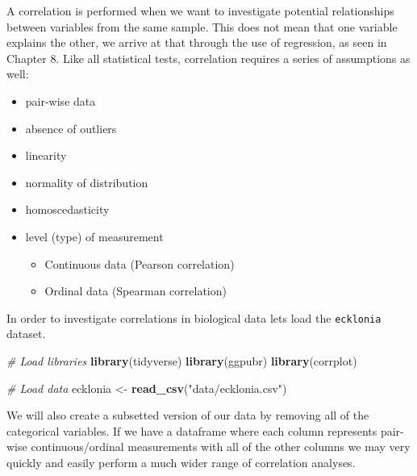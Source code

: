 \documentclass[english,10pt,a4paper,oneside]{book}
\providecommand{\tightlist}{%
  \setlength{\itemsep}{0pt}\setlength{\parskip}{0pt}}
\newenvironment{Shaded}{\begin{snugshade}}{\end{snugshade}}
\newcommand{\CommentTok}[1]{\textcolor[rgb]{0.56,0.35,0.01}{\textit{#1}}}
\newcommand{\KeywordTok}[1]{\textcolor[rgb]{0.13,0.29,0.53}{\textbf{#1}}}
\newcommand{\NormalTok}[1]{#1}
\newcommand{\OperatorTok}[1]{\textcolor[rgb]{0.81,0.36,0.00}{\textbf{#1}}}
\newcommand{\StringTok}[1]{\textcolor[rgb]{0.31,0.60,0.02}{#1}}
\theoremstyle{definition}
\theoremstyle{definition}
\theoremstyle{definition}
\theoremstyle{remark}
\begin{document}
A correlation is performed when we want to investigate potential
relationships between variables from the same sample. This does not mean
that one variable explains the other, we arrive at that through the use
of regression, as seen in Chapter 8. Like all statistical tests,
correlation requires a series of assumptions as well:

\begin{itemize}
\tightlist
\item
  pair-wise data
\item
  absence of outliers
\item
  linearity
\item
  normality of distribution
\item
  homoscedasticity
\item
  level (type) of measurement

  \begin{itemize}
  \tightlist
  \item
    Continuous data (Pearson correlation)
  \item
    Ordinal data (Spearman correlation)
  \end{itemize}
\end{itemize}

In order to investigate correlations in biological data lets load the
\texttt{ecklonia} dataset.

\begin{Shaded}
\begin{Highlighting}[]
\CommentTok{# Load libraries}
\KeywordTok{library}\NormalTok{(tidyverse)}
\KeywordTok{library}\NormalTok{(ggpubr)}
\KeywordTok{library}\NormalTok{(corrplot)}

\CommentTok{# Load data}
\NormalTok{ecklonia <-}\StringTok{ }\KeywordTok{read_csv}\NormalTok{(}\StringTok{"data/ecklonia.csv"}\NormalTok{)}
\end{Highlighting}
\end{Shaded}

We will also create a subsetted version of our data by removing all of
the categorical variables. If we have a dataframe where each column
represents pair-wise continuous/ordinal measurements with all of the
other columns we may very quickly and easily perform a much wider range
of correlation analyses.

\begin{Shaded}
\end{Shaded}
\end{document}
